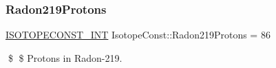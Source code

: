 \subsubsection{\texorpdfstring{Radon219\+Protons}{Radon219Protons}}
{\footnotesize\ttfamily \mbox{\hyperlink{group___isotope_const-_macros_ga5f18360b3e99483a35c32d789e62621c}{I\+S\+O\+T\+O\+P\+E\+C\+O\+N\+S\+T\+\_\+\+I\+NT}} Isotope\+Const\+::\+Radon219\+Protons = 86}

\$ \$ Protons in Radon-\/219. 